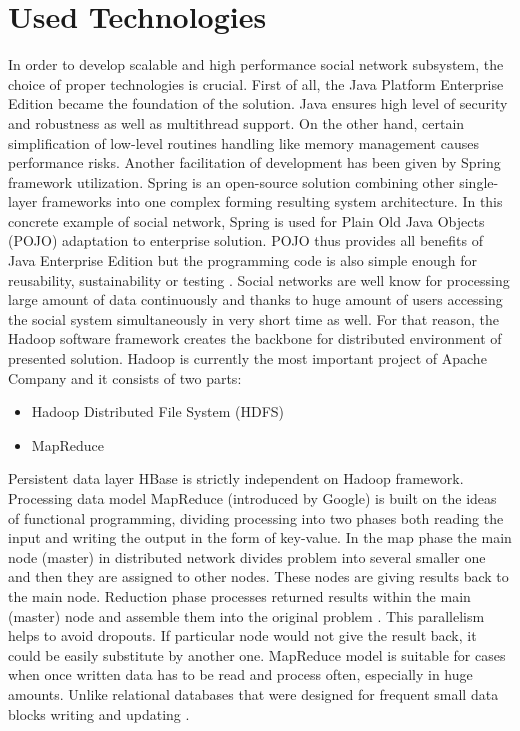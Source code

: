 \documentclass{llncs}
\begin{document}
\section{Used Technologies}
In order to develop scalable and high performance social network subsystem,
the choice of proper technologies is crucial.  First of all, the Java Platform
Enterprise Edition became the foundation of the solution. Java ensures high
level of security and robustness as well as multithread support. On the other
hand, certain simplification of low-level routines handling like memory
management causes performance risks. Another facilitation of development has
been given by Spring framework utilization. Spring is an open-source solution
combining other single-layer frameworks into one complex forming resulting
system architecture. In this concrete example of social network, Spring is
used for Plain Old Java Objects (POJO) adaptation to enterprise solution. POJO
thus provides all benefits of Java Enterprise Edition but the programming code
is also simple enough for reusability, sustainability or testing
\cite{machacek2008pro}.  Social networks are well know for processing large
amount of data continuously and thanks to huge amount of users accessing the
social system simultaneously in very short time as well. For that reason, the
Hadoop software framework creates the backbone for distributed environment of
presented solution. Hadoop is currently the most important project of Apache
Company and it consists of two parts:
\begin{itemize}
\item Hadoop Distributed File System (HDFS)
\item MapReduce
\end{itemize}
Persistent data layer HBase is strictly independent on Hadoop framework.
Processing data model MapReduce (introduced by Google) is built on the ideas
of functional programming, dividing processing into two phases both reading
the input and writing the output in the form of key-value. In the map phase
the main node (master) in distributed network divides problem into several
smaller one and then they are assigned to other nodes. These nodes are giving
results back to the main node. Reduction phase processes returned results
within the main (master) node and assemble them into the original problem
\cite{lin2010data}.  This parallelism helps to avoid dropouts. If particular
node would not give the result back, it could be easily substitute by another
one. MapReduce model is suitable for cases when once written data has to be
read and process often, especially in huge amounts. Unlike relational
databases that were designed for frequent small data blocks writing and
updating \cite{white2009hadoop}.
\end{document}
